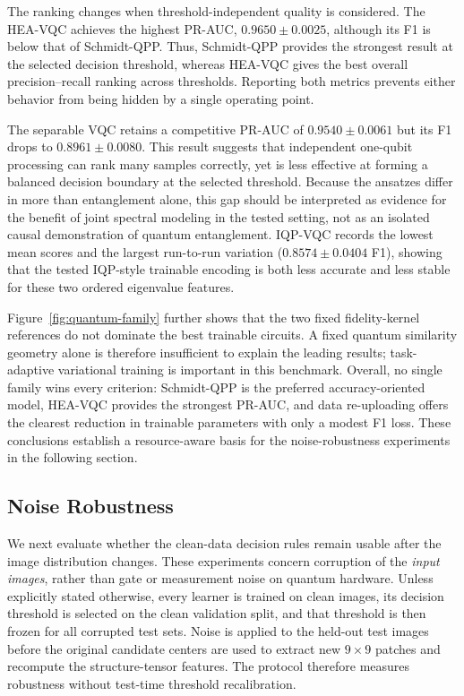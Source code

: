 \documentclass[11pt]{article}
\begin{document}
The ranking changes when threshold-independent quality is considered.  The
HEA-VQC achieves the highest PR-AUC, $0.9650\pm0.0025$, although its F1 is below
that of Schmidt-QPP.  Thus, Schmidt-QPP provides the strongest result at the
selected decision threshold, whereas HEA-VQC gives the best overall
precision--recall ranking across thresholds.  Reporting both metrics prevents
either behavior from being hidden by a single operating point.

The separable VQC retains a competitive PR-AUC of $0.9540\pm0.0061$ but its F1
drops to $0.8961\pm0.0080$.  This result suggests that independent one-qubit
processing can rank many samples correctly, yet is less effective at forming a
balanced decision boundary at the selected threshold.  Because the ansatzes
differ in more than entanglement alone, this gap should be interpreted as
evidence for the benefit of joint spectral modeling in the tested setting, not
as an isolated causal demonstration of quantum entanglement.  IQP-VQC records
the lowest mean scores and the largest run-to-run variation
($0.8574\pm0.0404$ F1), showing that the tested IQP-style trainable encoding is
both less accurate and less stable for these two ordered eigenvalue features.

Figure~\ref{fig:quantum-family} further shows that the two fixed
fidelity-kernel references do not dominate the best trainable circuits.  A
fixed quantum similarity geometry alone is therefore insufficient to explain
the leading results; task-adaptive variational training is important in this
benchmark.  Overall, no single family wins every criterion: Schmidt-QPP is the
preferred accuracy-oriented model, HEA-VQC provides the strongest PR-AUC, and
data re-uploading offers the clearest reduction in trainable parameters with
only a modest F1 loss.  These conclusions establish a resource-aware basis for
the noise-robustness experiments in the following section.

\subsection{Noise Robustness}
\label{sec:noise-robustness}

We next evaluate whether the clean-data decision rules remain usable after the
image distribution changes.  These experiments concern corruption of the
\emph{input images}, rather than gate or measurement noise on quantum hardware.
Unless explicitly stated otherwise, every learner is trained on clean images,
its decision threshold is selected on the clean validation split, and that
threshold is then frozen for all corrupted test sets.  Noise is applied to the
held-out test images before the original candidate centers are used to extract
new $9\times9$ patches and recompute the structure-tensor features.  The
protocol therefore measures robustness without test-time threshold
recalibration.
\end{document}
